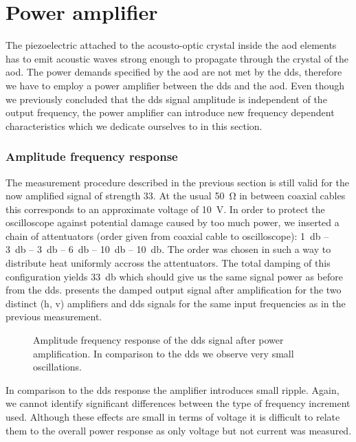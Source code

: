 \section{Power amplifier}

The piezoelectric attached to the acousto-optic crystal inside the \gls{aod}
elements has to emit acoustic waves strong enough to propagate through the
crystal of the \gls{aod}. The power demands specified by the \gls{aod} are
not met by the \gls{dds}, therefore we have to employ a power amplifier
between the \gls{dds} and the \gls{aod}. Even though we previously concluded
that the \gls{dds} signal amplitude is independent of the output frequency,
the power amplifier can introduce new frequency dependent characteristics
which we dedicate ourselves to in this section.

\subsubsection{Amplitude frequency response}\label{subsec:electronic_amplitude_frequency_response}

The measurement procedure described in the previous section is still valid
for the now amplified signal of strength \SI{33}{\decibelm}. At the
usual \SI{50}{\ohm} in between coaxial cables this corresponds to an
approximate voltage of \SI{10}{\volt}. In order to protect the oscilloscope
against potential damage caused by too much power, we inserted a chain of
attentuators (order given from coaxial cable to oscilloscope):
\SI{1}{\decibel} -- \SI{3}{\decibel} -- \SI{3}{\decibel} -- \SI{6}{\decibel}
-- \SI{10}{\decibel} -- \SI{10}{\decibel}. The order was chosen in such a way
to distribute heat uniformly accross the attentuators. The total
damping of this configuration yields \SI{33}{\decibel} which should give us
the same signal power as before from the \gls{dds}.
 presents the damped output signal
after amplification for the two distinct (\gls{h}, \gls{v}) amplifiers and
\gls{dds} signals for the same input frequencies as in the previous
measurement.
\begin{figure}[htb]
  \centering
  \begin{adjustbox}{width=\textwidth}
    
  \end{adjustbox}
  \caption{Amplitude frequency response of the \gls{dds} signal after power
    amplification. In comparison to the \gls{dds} we observe very small
    oscillations.
  }\label{fig:signal_amplification_response}
\end{figure}
In comparison to the \gls{dds} response the amplifier introduces small ripple.
Again, we cannot identify significant differences between the type of
frequency increment used. Although these effects are small in terms of voltage it is
difficult to relate them to the overall power response as only voltage but
not current was measured.

